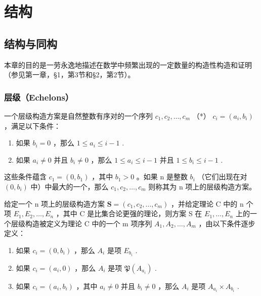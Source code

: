 \chapter{结构}

\section{结构与同构}

本章的目的是一劳永逸地描述在数学中频繁出现的一定数量的构造性构造和证明（参见第一章，§1，第3节和§2，第2节）。

\subsection{层级（Echelons）}

一个层级构造方案是自然整数有序对的一个序列 \(c_1, c_2, \ldots, c_m\) （*） \(c_i = (a_i, b_i)\) ，满足以下条件：

\begin{enumerate}
\def\labelenumi{(\alph{enumi})}
\item
  如果 \(b_{i} = 0\) ，那么 \(1 \leqslant a_{i} \leqslant i - 1\) .
\item
  如果 \(a_i \neq 0\) 并且 \(b_i \neq 0\) ，那么 \(1 \leqslant a_i \leqslant i - 1\) 并且 \(1 \leqslant b_i \leqslant i - 1\) .
\end{enumerate}

这些条件蕴含 \(c_{1}=(0,b_{1})\) ，其中 \(b_{1}>0\) 。如果 n 是整数 \(b_{i}\) （它们出现在对 \((0,b_{i})\) 中）中最大的一个，那么 \(c_{1},c_{2},\ldots,c_{m}\) 则称其为 n 项上的层级构造方案。

给定一个 n 项上的层级构造方案 \(\mathbf{S} = (c_{1}, c_{2}, \ldots, c_{m})\) ，并给定理论 C 中的 n 个项 \(E_{1}, E_{2}, \ldots, E_{n}\) ，其中 C 是比集合论更强的理论，则方案 S 在 \(E_{1}, \ldots, E_{n}\) 上的一个层级构造被定义为理论 C 中的一个 m 项序列 \(A_{1}, A_{2}, \ldots, A_{m}\) ，由以下条件逐步定义：

\begin{enumerate}
\def\labelenumi{(\alph{enumi})}
\item
  如果 \(c_{i} = (0, b_{i})\) ，那么 \(A_{i}\) 是项 \(E_{b_{i}}\) .
\item
  如果 \(c_{i} = (a_{i}, 0)\) ，那么 \(A_{i}\) 是项 \(\mathfrak{P}(A_{a_i})\) .
\item
  如果 \(c_{i} = (a_{i}, b_{i})\) ，其中 \(a_{i} \neq 0\) 并且 \(b_{i} \neq 0\) ，那么 \(A_{i}\) 是项 \(A_{a_{i}} \times A_{b_{i}}\) .
\end{enumerate}

